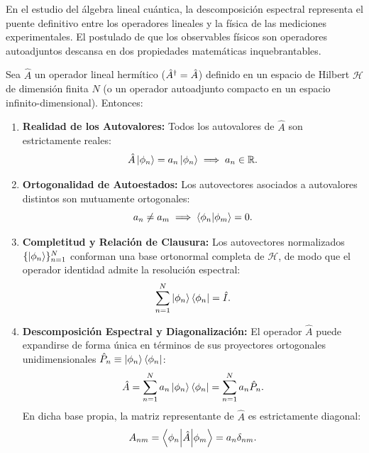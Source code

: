En el estudio del álgebra lineal cuántica, la descomposición espectral representa el puente definitivo entre los operadores lineales y la física de las mediciones experimentales. El postulado de que los observables físicos son operadores autoadjuntos descansa en dos propiedades matemáticas inquebrantables.

\begin{teoremabox}
    Sea $\hat{A}$ un operador lineal hermítico ($\hat{A}^\dagger = \hat{A}$) definido en un espacio de Hilbert $\mathcal{H}$ de dimensión finita $N$ (o un operador autoadjunto compacto en un espacio infinito-dimensional). Entonces:
    \begin{enumerate}
        \item \textbf{Realidad de los Autovalores:} Todos los autovalores de $\hat{A}$ son estrictamente reales:
        \begin{equation}
            \hat{A}\left| \phi_n \right\rangle = a_n\left| \phi_n \right\rangle \implies a_n \in \mathbb{R}.
        \end{equation}
        \item \textbf{Ortogonalidad de Autoestados:} Los autovectores asociados a autovalores distintos son mutuamente ortogonales:
        \begin{equation}
            a_n \neq a_m \implies \left\langle \phi_n \middle| \phi_m \right\rangle = 0.
        \end{equation}
        \item \textbf{Completitud y Relación de Clausura:} Los autovectores normalizados $\{\left| \phi_n \right\rangle\}_{n=1}^N$ conforman una base ortonormal completa de $\mathcal{H}$, de modo que el operador identidad admite la resolución espectral:
        \begin{equation}
            \sum_{n=1}^N \left| \phi_n \right\rangle\left\langle \phi_n \right| = \hat{I}.
        \end{equation}
        \item \textbf{Descomposición Espectral y Diagonalización:} El operador $\hat{A}$ puede expandirse de forma única en términos de sus proyectores ortogonales unidimensionales $\hat{P}_n \equiv \left| \phi_n \right\rangle\left\langle \phi_n \right|$:
        \begin{equation}
            \hat{A} = \sum_{n=1}^N a_n \left| \phi_n \right\rangle\left\langle \phi_n \right| = \sum_{n=1}^N a_n \hat{P}_n.
            \label{eq:descomposicion_espectral_teorica}
        \end{equation}
        En dicha base propia, la matriz representante de $\hat{A}$ es estrictamente diagonal:
        \begin{equation}
            A_{nm} = \left\langle \phi_n \middle| \hat{A} \middle| \phi_m \right\rangle = a_n \delta_{nm}.
        \end{equation}
    \end{enumerate}
\end{teoremabox}

